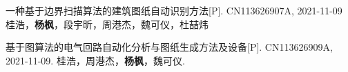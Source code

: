 

\begin{cvarticles}

  \begin{cvarticle}
    {一种基于边界扫描算法的建筑图纸自动识别方法[P]. CN113626907A, 2021-11-09}
    {桂浩，\textbf{杨枫}，段宇昕，周港杰，魏可仪，杜喆炜}
  \end{cvarticle}

  \begin{cvarticle}
    {基于图算法的电气回路自动化分析与图纸生成方法及设备[P]. CN113626909A, 2021-11-09.}
    {桂浩，周港杰，\textbf{杨枫}，魏可仪.}
  \end{cvarticle}

\end{cvarticles}


